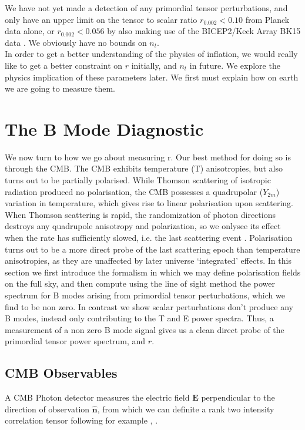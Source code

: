 \documentclass[a4paper,10pt]{article}
\renewcommand{\v}[1]{\mathbf{#1}}
\begin{document}
We have not yet made a detection of any primordial tensor perturbations, and only have an upper limit on the tensor to scalar ratio $r_{0.002}<0.10$ from Planck data alone, or $r_{0.002}<0.056$ by also making use of the BICEP2/Keck Array BK15 data \cite{planck-inflation}. We obviously have no bounds on $n_t$.\\

In order to get a better understanding of the physics of inflation, we would really like to get a better constraint on $r$ initially, and $n_t$ in future. We explore the physics implication of these parameters later. We first must explain how on earth we are going to measure them.

\newpage

\section{The B Mode Diagnostic}

We now turn to how we go about measuring r. Our best method for doing so is through the CMB. The CMB exhibits temperature (T) anisotropies, but also turns out to be partially polarised. While Thomson scattering of isotropic radiation produced no polarisation, the CMB possesses a quadrupolar ($Y_{2m}$) variation in temperature, which gives rise to linear polarisation upon scattering. When Thomson scattering is rapid, the randomization of photon directions destroys any quadrupole anisotropy and polarization, so we onlysee its effect when the rate has sufficiently slowed, i.e. the last scattering event \cite{hu}. Polarisation turns out to be a more direct probe of the last scattering epoch than temperature anisotropies, as they are unaffected by later universe `integrated' effects. In this section we first introduce the formalism in which we may define polarisation fields on the full sky, and then compute using the line of sight method the power spectrum for B modes arising from primordial tensor perturbations, which we find to be non zero. In contrast we show scalar perturbations don't produce any B modes, instead only contributing to the T and E power spectra. Thus, a measurement of a non zero B mode signal gives us a clean direct probe of the primordial tensor power spectrum, and $r$. 

\subsection{CMB Observables}

A CMB Photon detector measures the electric field $\v{E}$ perpendicular to the direction of observation $\hat{\v{n}}$, from which we can definite a rank two intensity correlation tensor following for example \cite{baldauf}, \cite{lewis}.
\end{document}
